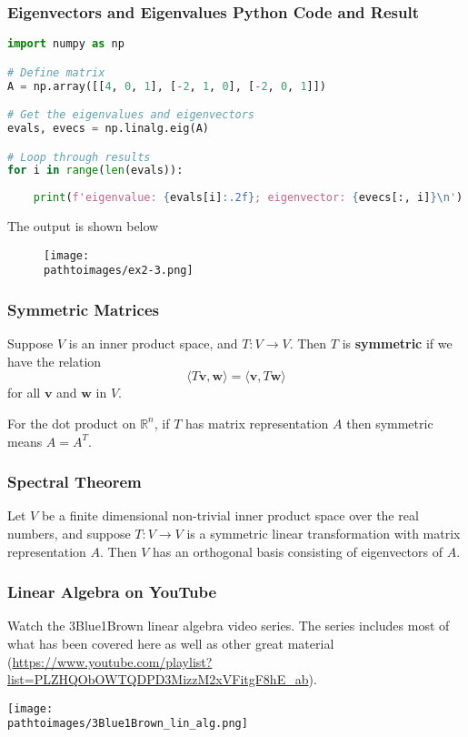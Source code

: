\documentclass{beamer}
\newcommand{\pathtoimages}{/Users/charlesrambo/Desktop/Bootcamp24/Images}
\begin{document}
\begin{frame}[fragile]
\frametitle{Eigenvectors and Eigenvalues Python Code and Result}

\begin{lstlisting}[language=Python]
import numpy as np

# Define matrix 
A = np.array([[4, 0, 1], [-2, 1, 0], [-2, 0, 1]])

# Get the eigenvalues and eigenvectors
evals, evecs = np.linalg.eig(A)

# Loop through results
for i in range(len(evals)):
    
    print(f'eigenvalue: {evals[i]:.2f}; eigenvector: {evecs[:, i]}\n')
 \end{lstlisting}

The output is shown below
\begin{figure}
\centering
\texttt{[image: \\pathtoimages/ex2-3.png]}
\end{figure}
\end{frame}

\begin{frame}
\frametitle{Symmetric Matrices}
\begin{Definition}
Suppose $V$ is an inner product space, and $T:V\to V$. Then $T$ is {\bf symmetric} if we have the relation
$$
\langle T{\boldsymbol v}, {\boldsymbol w}\rangle = \langle {\boldsymbol v}, T{\boldsymbol w}\rangle
$$
for all ${\boldsymbol v}$ and ${\boldsymbol w}$ in $V$. 
\end{Definition}
For the dot product on $\mathbb{R}^n$, if $T$ has matrix representation $A$ then symmetric means $A = A^T$.
\end{frame}

\begin{frame}
\frametitle{Spectral Theorem}

\begin{Theorem}
Let $V$ be a finite dimensional non-trivial inner product space over the real numbers, and suppose $T:V\to V$ is a symmetric linear transformation with matrix representation $A$. Then $V$ has an orthogonal basis consisting of eigenvectors of $A$.
\end{Theorem}


\end{frame}

\begin{frame}
\frametitle{Linear Algebra on YouTube}
\small
Watch the 3Blue1Brown linear algebra video series. The series includes most of what has been covered here as well as other great material ({\small \url{https://www.youtube.com/playlist?list=PLZHQObOWTQDPD3MizzM2xVFitgF8hE_ab}}).
\begin{center}
\texttt{[image: \\pathtoimages/3Blue1Brown\_lin\_alg.png]}
\end{center}
\end{frame}
\end{document}
